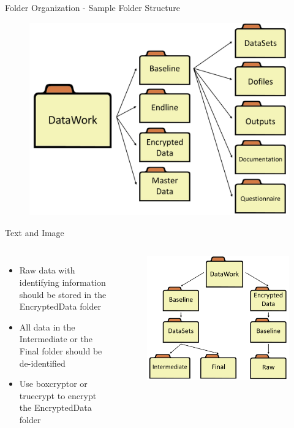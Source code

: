 \documentclass[aspectratio=169]{beamer}
\begin{document}
\begin{frame}{Folder Organization - Sample Folder Structure}
	\begin{figure}
		\centering
		\includegraphics[width=.7\linewidth]{img/folderstructure}
	\end{figure}
\end{frame}

\begin{frame}[fragile]{Text and Image}
	\begin{columns}[c]
		\begin{itemize}
			\item Raw data with identifying information should be stored in the EncryptedData folder
			\item All data in the Intermediate or the Final folder should be de-identified
			\item Use boxcryptor or truecrypt to encrypt the EncryptedData folder
		\end{itemize}
		
		\begin{figure}
			\centering
			\includegraphics[width=\linewidth]{img/folderstructure2}
		\end{figure}
	\end{columns}
\end{frame}
\end{document}
